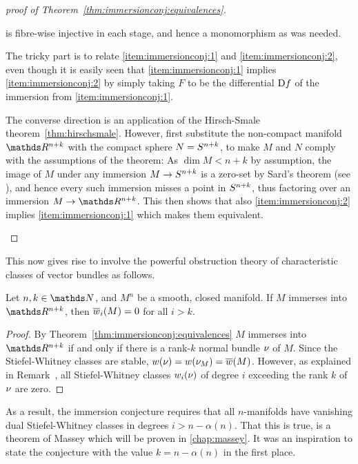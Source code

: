 \begin{proof}[proof of Theorem~\ref{thm:immersionconj:equivalences}]
\begin{description}
\begin{center}
    \end{center}
    is fibre-wise injective in each stage, and hence a monomorphism as
    was needed.
  \item[\ref{item:immersionconj:1}$\Leftrightarrow$\ref{item:immersionconj:2}:]
    The tricky part is to relate \ref{item:immersionconj:1} and
    \ref{item:immersionconj:2}, even though it is easily seen that
    \ref{item:immersionconj:1} implies \ref{item:immersionconj:2} by
    simply taking $F$ to be the differential $\mathrm{D} f$ of the
    immersion from \ref{item:immersionconj:1}.
    
    The converse direction is an application of the Hirsch-Smale
    theorem~\ref{thm:hirschsmale}.
    However, first substitute the non-compact manifold $\R^{n+k}$ with
    the compact sphere $N=S^{n+k}$, to make $M$ and $N$ comply
    with the assumptions of the theorem:
    As $\dim M<n+k$ by assumption,
    the image of $M$ under any immersion $M\to S^{n+k}$ is a
    zero-set by Sard's theorem (see \forexample \cite[Chap.~3,
    Theorem~1.3]{hirsch}), and hence every such immersion misses a
    point in $S^{n+k}$, thus factoring over an immersion
    $M\to\R^{n+k}$.
    This then shows that also \ref{item:immersionconj:2} implies
    \ref{item:immersionconj:1} which makes them equivalent.
    \qedhere
  \end{description}
\end{proof}

This now gives rise to involve the powerful obstruction theory of
characteristic classes of vector bundles as follows.
\begin{Cor}\label{cor:obstruction}
  Let $n,k\in\Nat$, and $M^n$ be a smooth, closed manifold.
  If $M$ immerses into $\R^{n+k}$, then ${\overline{w}_{i}}(M)=0$ for all
  $i>k$.
  \begin{proof}
    By Theorem~\ref{thm:immersionconj:equivalences} $M$ immerses
    into $\R^{n+k}$ if and only if there is a rank-$k$
    normal bundle $\nu_{}$ of $M$.
    Since the Stiefel-Whitney classes are stable,
    ${w}(\nu_{})={w}(\nu_{M})={\overline{w}}(M)$.
    However, as explained in
    Remark~,
    all Stiefel-Whitney classes ${w_{i}}(\nu_{})$ of degree $i$ exceeding
    the rank $k$ of $\nu_{}$ are zero.
  \end{proof}
\end{Cor}
As a result, the immersion conjecture requires that all $n$-manifolds
have vanishing dual Stiefel-Whitney classes in degrees $i>n-\alpha(n)$.
That this is true, is a theorem of Massey which will be proven in
\autoref{chap:massey}. It was an inspiration to state the conjecture
with the value $k=n-\alpha(n)$ in the first place.


